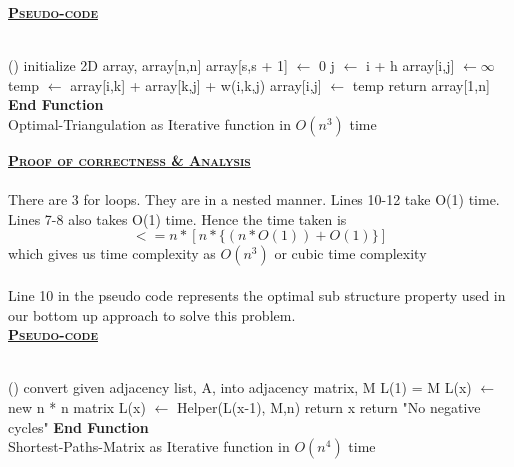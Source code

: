 \documentclass[a4 paper]{article}
\begin{document}
\newpage
{}
\textbf{\underline{\textsc{Pseudo-code}}}\\\\
\begin{algorithm}[H]
\SetAlgoLined
{}
%
\Fn(){\FRecurs}
{
    initialize 2D array, array[n,n]\;
    {
        array[s,s + 1] $\leftarrow$ 0\;
    }
    {   
        {
            j $\leftarrow$ i + h\;
            array[i,j] $\leftarrow \infty$\;
            {
                temp $\leftarrow$ array[i,k] + array[k,j] + w(i,k,j)\;
                {
                     array[i,j] $\leftarrow$ temp\;
                }
            }
        }
    }
    return array[1,n]\;
}
\textbf{End Function}\\
\caption{Optimal-Triangulation as Iterative function in $O(n^{3})$ time}
\end{algorithm}
\vspace{4mm}
\textbf{\underline{\textsc{Proof of correctness \& Analysis}}}\\\\
There are 3 for loops. They are in a nested manner. Lines 10-12 take O(1) time. Lines 7-8 also takes O(1) time. Hence the time taken is $$<= n*[n*\{(n*O(1))+O(1)\}]$$which gives us time complexity as $O(n^{3})$ or cubic time complexity\\\\
Line 10 in the pseudo code represents the optimal sub structure property used in our bottom up approach to solve this problem.\\
\newpage
{}
\textbf{\underline{\textsc{Pseudo-code}}}\\\\
\begin{algorithm}[H]
\SetAlgoLined
{}
%
\Fn(){\FRecurs}
{
    convert given adjacency list, A, into adjacency matrix, M\;
    L(1) = M\;
    {   
        L(x) $\leftarrow$ new n * n matrix\;
        L(x) $\leftarrow$ Helper(L(x-1), M,n)
        {
            return x 
        }
    }
    return "No negative cycles"\;
}
\textbf{End Function}\\
\caption{Shortest-Paths-Matrix as Iterative function in $O(n^{4})$ time}
\end{algorithm}
\end{document}
